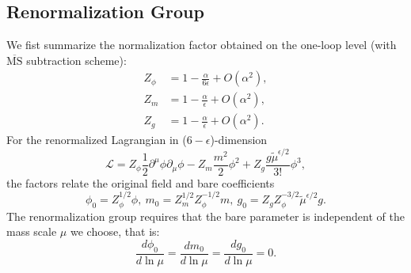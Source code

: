 \subsection{Renormalization Group}
We fist summarize the normalization factor obtained on the one-loop level (with $\overline{\mathrm{MS}}$ subtraction scheme):
\begin{equation}
\begin{aligned}
	Z_{\phi} &= 1-\frac{\alpha}{6\epsilon} + O(\alpha^2), \\
	Z_{m} &= 1-\frac{\alpha}{\epsilon}+ O(\alpha^2), \\
	Z_{g} &= 1-\frac{\alpha}{\epsilon}+ O(\alpha^2).
\end{aligned}
\end{equation}
For the renormalized Lagrangian in ($6-\epsilon$)-dimension
\begin{equation}
	\mathcal L 
	= Z_{\phi}\frac{1}{2} \partial^\mu\phi\partial_\mu\phi - 
	Z_m \frac{m^2}{2}\phi^2 + Z_g\frac{g\tilde{\mu}^{\epsilon/2}}{3!}\phi^3,
\end{equation}
the factors relate the original field and bare coefficients
\begin{equation}
	\phi_0 = Z_\phi^{1/2}\phi,\ 
	m_0 = Z_m^{1/2} Z_\phi^{-1/2}m,\ 
	g_0 = Z_g Z_{\phi}^{-3/2} \tilde{\mu}^{\epsilon/2}g.
\end{equation}
The renormalization group requires that the bare parameter is independent of the mass scale $\mu$ we choose, that is:
\begin{equation}
	\frac{d\phi_0}{d \ln \mu} 
	= \frac{dm_0}{d \ln \mu}
	= \frac{dg_0}{d \ln \mu}
	= 0.
\end{equation}


